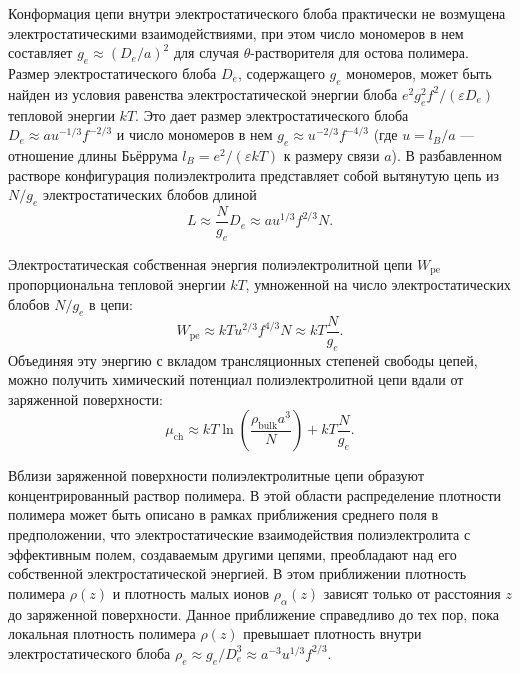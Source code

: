 \documentclass[12pt,a4paper]{article}
\begin{document}
Конформация цепи внутри электростатического блоба практически не возмущена электростатическими взаимодействиями, при этом число мономеров в нем составляет $g_e \approx (D_e / a)^2$ для случая $\theta$-растворителя для остова полимера. Размер электростатического блоба $D_e$, содержащего $g_e$ мономеров, может быть найден из условия равенства электростатической энергии блоба $e^2 g_e^2 f^2 / (\varepsilon D_e)$ тепловой энергии $kT$. Это дает размер электростатического блоба $D_e \approx a u^{-1/3} f^{-2/3}$ и число мономеров в нем $g_e \approx u^{-2/3} f^{-4/3}$ (где $u = l_B / a$ --- отношение длины Бьёррума $l_B = e^2 / (\varepsilon k T)$ к размеру связи $a$). В разбавленном растворе конфигурация полиэлектролита представляет собой вытянутую цепь из $N/g_e$ электростатических блобов длиной
\begin{equation}
L \approx \frac{N}{g_e} D_e \approx a u^{1/3} f^{2/3} N.
\end{equation}

Электростатическая собственная энергия полиэлектролитной цепи $W_{\text{pe}}$ пропорциональна тепловой энергии $kT$, умноженной на число электростатических блобов $N/g_e$ в цепи:
\begin{equation}
W_{\text{pe}} \approx k T u^{2/3} f^{4/3} N \approx k T \frac{N}{g_e}.
\end{equation}
Объединяя эту энергию с вкладом трансляционных степеней свободы цепей, можно получить химический потенциал полиэлектролитной цепи вдали от заряженной поверхности:
\begin{equation}
\mu_{\text{ch}} \approx k T \ln\left( \frac{\rho_{\text{bulk}} a^3}{N} \right) + k T \frac{N}{g_e}.
\end{equation}

Вблизи заряженной поверхности полиэлектролитные цепи образуют концентрированный раствор полимера. В этой области распределение плотности полимера может быть описано в рамках приближения среднего поля в предположении, что электростатические взаимодействия полиэлектролита с эффективным полем, создаваемым другими цепями, преобладают над его собственной электростатической энергией. В этом приближении плотность полимера $\rho(z)$ и плотность малых ионов $\rho_\alpha(z)$ зависят только от расстояния $z$ до заряженной поверхности. Данное приближение справедливо до тех пор, пока локальная плотность полимера $\rho(z)$ превышает плотность внутри электростатического блоба $\rho_e \approx g_e / D_e^3 \approx a^{-3} u^{1/3} f^{2/3}$.
\end{document}
